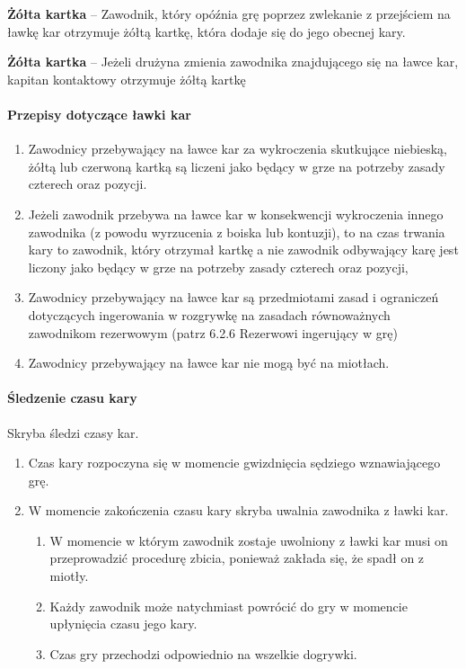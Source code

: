 \documentclass[12pt]{article}
\newcommand\yellowcard[1]{\bgroup\textcolor{darkyellow}{\textbf{#1}}}
\begin{document}
\yellowcard{Żółta kartka} -- Zawodnik, który opóźnia grę poprzez zwlekanie z
przejściem na ławkę kar otrzymuje żółtą kartkę, która dodaje się do jego
obecnej kary.

\yellowcard{Żółta kartka} -- Jeżeli drużyna zmienia zawodnika znajdującego się
na ławce kar, kapitan kontaktowy otrzymuje żółtą kartkę

\paragraph{Przepisy dotyczące ławki kar}

\begin{enumerate}
	\item
	      Zawodnicy przebywający na ławce kar za wykroczenia skutkujące
	      niebieską, żółtą lub czerwoną kartką są liczeni jako będący w grze na
	      potrzeby zasady czterech oraz pozycji.
	\item
	      Jeżeli zawodnik przebywa na ławce kar w konsekwencji wykroczenia
	      innego zawodnika (z powodu wyrzucenia z boiska lub kontuzji), to na
	      czas trwania kary to zawodnik, który otrzymał kartkę a nie zawodnik
	      odbywający karę jest liczony jako będący w grze na potrzeby zasady
	      czterech oraz pozycji,
	\item
	      Zawodnicy przebywający na ławce kar są przedmiotami zasad i ograniczeń
	      dotyczących ingerowania w rozgrywkę na zasadach równoważnych
	      zawodnikom rezerwowym (patrz 6.2.6 Rezerwowi ingerujący w grę)
	\item
	      Zawodnicy przebywający na ławce kar nie mogą być na miotłach.
\end{enumerate}

\paragraph{Śledzenie czasu kary}
Skryba śledzi czasy kar.

\begin{enumerate}
	\item
	      Czas kary rozpoczyna się w momencie gwizdnięcia sędziego wznawiającego
	      grę.
	\item
	      W momencie zakończenia czasu kary skryba uwalnia zawodnika z ławki
	      kar.

	      \begin{enumerate}
		      \item
		            W momencie w którym zawodnik zostaje uwolniony z ławki kar musi on
		            przeprowadzić procedurę zbicia, ponieważ zakłada się, że spadł on z
		            miotły.
		      \item
		            Każdy zawodnik może natychmiast powrócić do gry w momencie
		            upłynięcia czasu jego kary.
		      \item
		            Czas gry przechodzi odpowiednio na wszelkie dogrywki.
	      \end{enumerate}
\end{enumerate}
\end{document}
